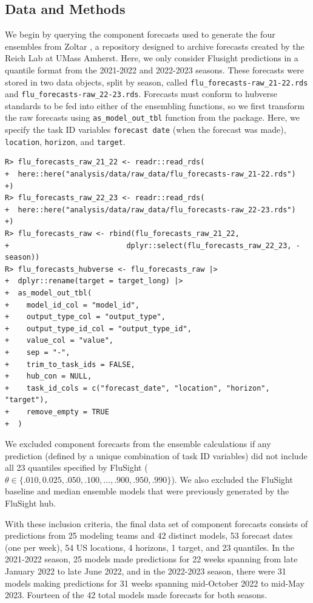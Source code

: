 \documentclass[
  article,
  shortnames,
  notitle]{jss}
\begin{document}
\subsection{Data and Methods}\label{data-and-methods}

We begin by querying the component forecasts used to generate the four
ensembles from Zoltar \citep{reich_zoltar_2021}, a repository designed
to archive forecasts created by the Reich Lab at UMass Amherst. Here, we
only consider Flusight predictions in a quantile format from the
2021-2022 and 2022-2023 seasons. These forecasts were stored in two data
objects, split by season, called \texttt{flu\_forecasts-raw\_21-22.rds}
and \texttt{flu\_forecasts-raw\_22-23.rds}. Forecasts must conform to
hubverse standards to be fed into either of the ensembling functions, so
we first transform the raw forecasts using \texttt{as\_model\_out\_tbl}
function from the  package. Here, we specify the task ID
variables \texttt{forecast\ date} (when the forecast was made),
\texttt{location}, \texttt{horizon}, and \texttt{target}.

\begin{verbatim}
R> flu_forecasts_raw_21_22 <- readr::read_rds(
+  here::here("analysis/data/raw_data/flu_forecasts-raw_21-22.rds")
+)
R> flu_forecasts_raw_22_23 <- readr::read_rds(
+  here::here("analysis/data/raw_data/flu_forecasts-raw_22-23.rds")
+)
R> flu_forecasts_raw <- rbind(flu_forecasts_raw_21_22,
+                           dplyr::select(flu_forecasts_raw_22_23, -season))
R> flu_forecasts_hubverse <- flu_forecasts_raw |>
+  dplyr::rename(target = target_long) |>
+  as_model_out_tbl(
+    model_id_col = "model_id",
+    output_type_col = "output_type",
+    output_type_id_col = "output_type_id",
+    value_col = "value",
+    sep = "-",
+    trim_to_task_ids = FALSE,
+    hub_con = NULL,
+    task_id_cols = c("forecast_date", "location", "horizon", "target"),
+    remove_empty = TRUE
+  )
\end{verbatim}

We excluded component forecasts from the ensemble calculations if any
prediction (defined by a unique combination of task ID variables) did
not include all 23 quantiles specified by FluSight
(\(\theta \in \{.010, 0.025, .050, .100, ..., .900, .950, .990\}\)). We
also excluded the FluSight baseline and median ensemble models that were
previously generated by the FluSight hub.

With these inclusion criteria, the final data set of component forecasts
consists of predictions from 25 modeling teams and 42 distinct models,
53 forecast dates (one per week), 54 US locations, 4 horizons, 1 target,
and 23 quantiles. In the 2021-2022 season, 25 models made predictions
for 22 weeks spanning from late January 2022 to late June 2022, and in
the 2022-2023 season, there were 31 models making predictions for 31
weeks spanning mid-October 2022 to mid-May 2023. Fourteen of the 42
total models made forecasts for both seasons.
\end{document}
